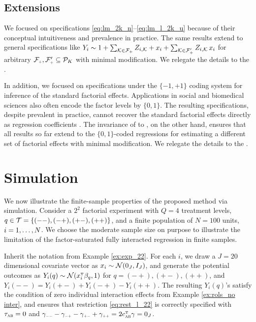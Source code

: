 \documentclass[11pt]{article}
\theoremstyle{definition}
\begin{document}
\subsection{Extensions}
 


We focused on specifications \eqref{eq:lm_2k_n}--\eqref{eq:lm_l_2k_u} because of their conceptual intuitiveness and prevalence in practice. 
The same results extend to general specifications like 
$
Y_i \sim 1 + \sum_{\mk \in \mfp} \zimks + x_i + \sum_{\mk \in \mfp'} \zimks \, \cxi$ for arbitrary $\mfp, \mfp' \subseteq \pk$ 
with minimal modification. 
We relegate the details to the \sm. 

In addition, we focused on specifications under the $\{-1,+1\}$ coding system for inference of the standard factorial effects.
Applications in social and biomedical sciences also often encode the factor levels by $\{0, 1\}$.
The resulting specifications, despite prevalent in practice, cannot recover the standard factorial effects directly as regression coefficients \citep{ZDa}. 
The invariance of \olss to {\ndt}, on the other hand, ensures that all results so far extend to the $\{0,1\}$-coded regressions for estimating a different set of factorial effects with minimal modification. We relegate the details to the \sm.





  
\section{Simulation}\label{sec:simulation}

We now illustrate the finite-sample properties of the proposed method via simulation.
%
Consider a $2^2$ factorial experiment with $Q = 4$ treatment levels, $q  \in  \mathcal{T} = \{(--), (-+), (+-), (++)\}$, and a finite population of $N=100$ units, $i = 1, \ldots,N$. 
We choose the moderate sample size on purpose to illustrate the limitation of the factor-saturated fully interacted regression in finite samples. 

Inherit the notation from Example \ref{ex:exp_22}.
For each $i$, we draw a $J=20$ dimensional covariate vector as $x_i \sim \mathcal{N}(0_J, I_J)$, and generate the potential outcomes as $Y_i(q) \sim \mathcal{N}( x_i^{ \mathrm{\scriptscriptstyle T} } \beta_q , 1)$ for $q = (-+), (+-), (++)$, and $Y_i(--) = Y_i(+-) + Y_i(-+) - Y_i(++)$. 
The resulting $Y_i(q)$'s satisfy the condition of zero individual interaction effects from Example \ref{ex:rols_no inter}, and ensures that restriction \eqref{eq:rest_l_22} is correctly specified with  $\tau_{\textsc{ab}} = 0$ and $\gamma_{\mmm\mmm} - \gamma_{\mmm\pp} - \gamma_{\pp\mmm} + \gamma_{\pp\pp} = 2\cab^\T \gamma = 0_J$.
\end{document}
